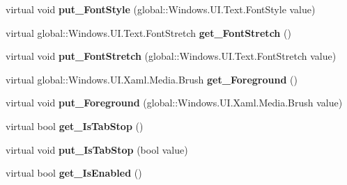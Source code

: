 \begin{DoxyCompactItemize}
virtual void {\bfseries put\+\_\+\+Font\+Style} (global\+::\+Windows.\+U\+I.\+Text.\+Font\+Style value)
\item 
\mbox{\label{class_windows_1_1_u_i_1_1_xaml_1_1_controls_1_1_control_a8ded01d56e501532b1c98b68fa92f29f}} 
virtual global\+::\+Windows.\+U\+I.\+Text.\+Font\+Stretch {\bfseries get\+\_\+\+Font\+Stretch} ()
\item 
\mbox{\label{class_windows_1_1_u_i_1_1_xaml_1_1_controls_1_1_control_adaa41b9c66a1b753259be5ba549c232e}} 
virtual void {\bfseries put\+\_\+\+Font\+Stretch} (global\+::\+Windows.\+U\+I.\+Text.\+Font\+Stretch value)
\item 
\mbox{\label{class_windows_1_1_u_i_1_1_xaml_1_1_controls_1_1_control_a31608c773e66c230ddaf697df9fbfccb}} 
virtual global\+::\+Windows.\+U\+I.\+Xaml.\+Media.\+Brush {\bfseries get\+\_\+\+Foreground} ()
\item 
\mbox{\label{class_windows_1_1_u_i_1_1_xaml_1_1_controls_1_1_control_aaadea9b23ccdedf4680ffca7d20d7a58}} 
virtual void {\bfseries put\+\_\+\+Foreground} (global\+::\+Windows.\+U\+I.\+Xaml.\+Media.\+Brush value)
\item 
\mbox{\label{class_windows_1_1_u_i_1_1_xaml_1_1_controls_1_1_control_a4aed62fb59fe596d9d9727b4fa885234}} 
virtual bool {\bfseries get\+\_\+\+Is\+Tab\+Stop} ()
\item 
\mbox{\label{class_windows_1_1_u_i_1_1_xaml_1_1_controls_1_1_control_a494c6dd6af97e18d86690cb2cae23c3d}} 
virtual void {\bfseries put\+\_\+\+Is\+Tab\+Stop} (bool value)
\item 
\mbox{\label{class_windows_1_1_u_i_1_1_xaml_1_1_controls_1_1_control_ad11dee8e9b7e09556e69903cade192dd}} 
virtual bool {\bfseries get\+\_\+\+Is\+Enabled} ()
\item 
\mbox{\label{class_windows_1_1_u_i_1_1_xaml_1_1_controls_1_1_control_ae951ae9f8506d85d623dc31713092569}} 

\end{DoxyCompactItemize}
